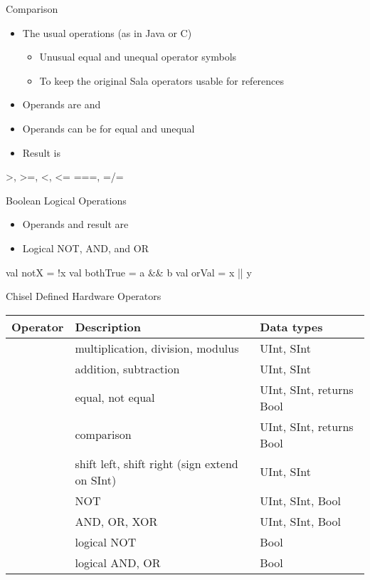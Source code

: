 \begin{frame}[fragile]{Comparison}
\begin{itemize}
\item The usual operations (as in Java or C)
\begin{itemize}
\item Unusual equal and unequal operator symbols
\item To keep the original Sala operators usable for references
\end{itemize}
\item Operands are  and 
\item Operands can be  for equal and unequal
\item Result is 
\end{itemize}
\begin{chisel}
>, >=, <, <=
===, =/=
\end{chisel}
\end{frame}

\begin{frame}[fragile]{Boolean Logical Operations}
\begin{itemize}
\item Operands and result are 
\item Logical NOT, AND, and OR
\end{itemize}
\begin{chisel}
val notX = !x
val bothTrue = a && b
val orVal = x || y
\end{chisel}
\end{frame}

\begin{frame}[fragile]{Chisel Defined Hardware Operators}
\begin{table}
{\footnotesize
  \begin{tabular}{lll}
    \toprule
    Operator & Description & Data types \\
    \midrule
    \code{* / \%} & multiplication, division, modulus & UInt, SInt \\
    \code{+ -} & addition, subtraction & UInt, SInt \\
    \code{=== =/=} & equal, not equal & UInt, SInt, returns Bool \\
    \code{> >= < <=} & comparison & UInt, SInt, returns Bool \\
    \code{<< >>} & shift left, shift right (sign extend on SInt) & UInt, SInt \\
    \code{\~} & NOT & UInt, SInt, Bool \\
    \code{\& | \^} & AND, OR, XOR & UInt, SInt, Bool \\
    \code{!} & logical NOT & Bool \\
    \code{\&\& ||} & logical AND, OR & Bool \\
    \bottomrule 
  \end{tabular} 
  }
\end{table}
\end{frame}



